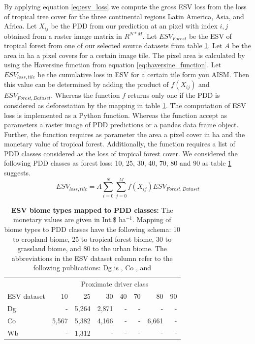 		By applying equation \ref{eq:esv_loss} we compute the gross \ac{ESV} loss from the loss of tropical tree cover for the three continental regions Latin America, Asia, and Africa. Let $X_{ij}$ be the \ac{PDD} from our prediction at an pixel with index $i,j$ obtained from a raster image matrix in $R^{N*M}$. Let $ESV_{Forest}$ be the \ac{ESV} of tropical forest from one of our selected source datasets from table \ref{tab:esv_mapping}. Let $A$ be the area in ha a pixel covers for a certain image tile. The pixel area is calculated by using the Haversine function from equation \ref{eq:haversine_function}. Let $ESV_{loss,tile}$ be the cumulative loss in \ac{ESV} for a certain tile form you \ac{AISM}. Then this value can be determined by adding the product of $f(X_{ij})$ and $ESV_{Forest,Dataset}$. Whereas the function $f$ returns only one if the \ac{PDD} is considered as deforestation by the mapping in table \ref{tab:esv_mapping}. The computation of \ac{ESV} loss is implemented as a Python function. Whereas the function accept as parameters a raster image of \ac{PDD} predictions or a pandas data frame object. Further, the function requires as parameter the area a pixel cover in ha and the monetary value of tropical forest. Additionally, the function requires a list of \ac{PDD} classes considered as the loss of tropical forest cover. We considered the following \ac{PDD} classes as forest loss: 10, 25, 30, 40, 70, 80 and 90 as table \ref{tab:esv_mapping} suggests.
		\begin{equation}
		\label{eq:esv_loss}
			ESV_{loss,tile} = A\displaystyle\sum_{i=0}^{N}\displaystyle\sum_{j=0}^{M} f(X_{ij})ESV_{Forest,Dataset}
		\end{equation}
		\begin{table}[ht]
			\centering
			\caption[ESV biome types mapped to PDD classes]{\textbf{ESV biome types mapped to PDD classes:} The monetary values are given in Int.\$ ha$^{-1}$. Mapping of biome types to PDD classes have the following schema: 10 to cropland biome, 25 to tropical forest biome, 30 to grassland biome, and 80 to the urban biome. The abbreviations in the ESV dataset column refer to the following publications: Dg is \citeauthor{Groot2012}, Co \citeauthor{Costanza2014}, and \citeauthor{Siikamaki2015}}
			\label{tab:esv_mapping}
			\begin{tabular}{lrrrrrrr}
				\hline
				& \multicolumn{7}{c}{Proximate driver class} \\
				ESV dataset & 10 & 25 & 30 & 40 & 70 & 80 & 90 \\
				\hline
				Dg & - & 5,264 & 2,871 & - & - & - & - \\
				Co & 5,567 & 5,382 & 4,166 & - & - & 6,661 & - \\
				Wb & - & 1,312 & - & - & - & - & - \\
				\hline
			\end{tabular}
		\end{table}

